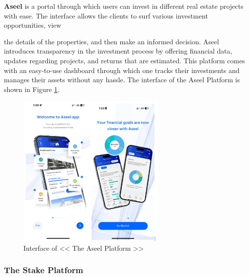 \textbf{\textcolor{primary}{Aseel}} is a portal through which users can invest in different real estate projects with ease. The interface allows the clients to surf various investment opportunities, view 

the details of the properties, and then make an informed decision. Aseel introduces transparency in the investment process by offering financial data, updates regarding projects, and returns that are estimated. This platform comes with an easy-to-use dashboard through which one tracks their investments and manages their assets without any hassle. The interface of the Aseel Platform is shown in Figure \ref{fig:aseel-platform}.

\newpage
\begin{figure}[htbp]
    \centering
    \includegraphics[width=0.65\textwidth]{images/Interface-of-the Aseel Platform.png}
    \caption{Interface of << The Aseel Platform >>}
    \label{fig:aseel-platform}
\end{figure}


\subsubsection{The Stake Platform}

